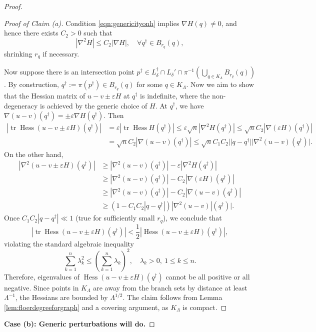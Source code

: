 \documentclass[11pt,a4paper]{article}
\numberwithin{equation}{section}%
\theoremstyle{definition}
\begin{document}
\begin{proof}
\begin{proof}[Proof of Claim (a)]
    Condition \eqref{eqn:genericityonh} implies $\nabla H(q)\neq 0$, and hence there exists $C_2>0$ such that
    $$|\nabla^2 H|\leqslant C_2|\nabla H|,\quad \forall q^\dagger\in B_{r_q}(q),$$
    shrinking $r_q$ if necessary. 

    Now suppose there is an intersection point $p^{\dagger}\in L_\delta^\dagger\cap L_\delta'\cap \pi^{-1}(\bigcup\limits_{q\in K_\Lambda}B_{r_q}(q))$. By construction,  $q^{\dagger}:=\pi(p^\dagger)\in B_{r_q}(q)$ for some $q\in K_\Lambda$. Now we aim to show that the Hessian matrix of $u-v\pm \varepsilon H$ at $q^\dagger$ is indefinite, where the non-degeneracy is achieved by the generic choice of $H$.  
    At $q^\dagger$, we have $\nabla(u-v)(q^\dagger)=\pm \varepsilon\nabla H(q^\dagger)$. Then
   \begin{equation*}
       \begin{aligned}
           \left|\operatorname{tr}\operatorname{Hess}(u-v\pm \varepsilon H)(q^\dagger)\right|&=\varepsilon \left|\operatorname{tr}\operatorname{Hess}H(q^\dagger)\right|\leqslant \varepsilon\sqrt{n}|\nabla^2H(q^\dagger)|\leqslant \sqrt{n} C_2|\nabla (\varepsilon H)(q^\dagger)|\\&=\sqrt{n}C_2|\nabla (u-v)(q^\dagger)|\leqslant \sqrt{n}C_1 C_2||q-q^{\dagger}||\nabla^2(u-v)(q^\dagger)|.
       \end{aligned}
   \end{equation*}
   On the other hand, 
   \begin{equation*}
       \begin{aligned}
           |\nabla^2(u-v\pm \varepsilon H)(q^\dagger)|&\geqslant |\nabla^2(u-v)(q^\dagger)|-\varepsilon|\nabla^2H(q^\dagger)|
           \\&\geqslant |\nabla^2(u-v)(q^\dagger)|-C_2|\nabla (\varepsilon H)(q^\dagger)|
           \\&\geqslant |\nabla^2(u-v)(q^\dagger)|-C_2|\nabla (u-v)(q^\dagger)|
           \\&\geqslant (1-C_1C_2|q-q^{\dagger}|)|\nabla^2(u-v)|(q^\dagger)|. 
       \end{aligned}
   \end{equation*}
   Once $C_1C_2|q-q^{\dagger}|\ll 1$ (true for sufficiently small $r_q$), we conclude that
   $$|\operatorname{tr}\operatorname{Hess}(u-v\pm \varepsilon H)(q^\dagger)|<\frac{1}{2}|\operatorname{Hess}(u-v\pm \varepsilon H)(q^\dagger)|,$$
   violating the standard algebraic inequality
   \begin{equation}
       \label{eqn:eigenvalueineq}
        \sum_{k=1}^n\lambda_k^2\leqslant \left(\sum_{k=1}^n\lambda_k\right)^2,\quad  \lambda_k>0,~1\leqslant k\leqslant n.
   \end{equation}
    Therefore, eigenvalues of $\operatorname{Hess}(u-v\pm \varepsilon H)(q^\dagger)$ cannot be all positive or all negative. Since points in $K_{\Lambda}$ are away from the branch sets by distance at least $\Lambda^{-1}$, the Hessians are bounded by $\Lambda^{1/2}$. The claim follows from Lemma \ref{lem:floerdegreeforgraph} and a covering argument, as $K_{\Lambda}$ is compact. 
\end{proof}
\textbf{Case (b): Generic perturbations will do. }


\end{proof}
\end{document}
